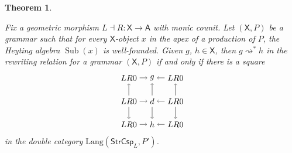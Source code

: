 \documentclass{amsart}
\newcommand{\A}{\cat{A}}
\newcommand{\X}{\cat{X}}
\newcommand{\StrCsp}{\cat{StrCsp}}
\newcommand{\Lang}{\mathrm{Lang}}
\newcommand{\cat}[1]{\mathsf{#1}}
\newcommand{\from}{\colon}
\newcommand{\deriv}[2]{#1 \rightsquigarrow^\ast #2}
\DeclareMathOperator{\Sub}{Sub}
\newtheorem{theorem}{Theorem}[section]
\theoremstyle{remark}
\theoremstyle{definition}
\begin{document}
\begin{theorem} \label{thm:inductive-rewriting}
  
  Fix a geometric morphism $ L \dashv R \from \X \to \A $ with monic
  counit. Let $ ( \X , P ) $ be a grammar such that for every
  $ \X $-object $ x $ in the apex of a production of $ P $, the
  Heyting algebra $ \Sub (x) $ is well-founded. Given $ g $,
  $ h \in \X $, then $ \deriv{g}{h} $ in the rewriting relation for a
  grammar $ ( \X , P ) $ if and only if there is a square
  \[
    \begin{tikzpicture}
      \node (1t) at (0,2) {$ LR 0 $};
      \node (2t) at (1,2) {$ g $};
      \node (3t) at (2,2) {$ LR 0 $};
      \node (1m) at (0,1) {$ LR 0 $};
      \node (2m) at (1,1) {$ d $};
      \node (3m) at (2,1) {$ LR 0 $};
      \node (1b) at (0,0) {$ LR 0 $};
      \node (2b) at (1,0) {$ h $};
      \node (3b) at (2,0) {$ LR 0 $};
      \draw [->] (1t) to node [] {\scriptsize{$  $}} (2t);
      \draw [->] (3t) to node [] {\scriptsize{$  $}} (2t);
      \draw [->] (1m) to node [] {\scriptsize{$  $}} (2m);
      \draw [->] (3m) to node [] {\scriptsize{$  $}} (2m);
      \draw [->] (1b) to node [] {\scriptsize{$  $}} (2b);
      \draw [->] (3b) to node [] {\scriptsize{$  $}} (2b);
      \draw [->] (1m) to node [] {\scriptsize{$  $}} (1t);
      \draw [->] (1m) to node [] {\scriptsize{$  $}} (1b);
      \draw [->] (2m) to node [] {\scriptsize{$  $}} (2t);
      \draw [->] (2m) to node [] {\scriptsize{$  $}} (2b);
      \draw [->] (3m) to node [] {\scriptsize{$  $}} (3t);
      \draw [->] (3m) to node [] {\scriptsize{$  $}} (3b);
    \end{tikzpicture}
  \]
  in the double category $ \Lang ( \StrCsp_L , P' ) $.
\end{theorem}
\end{document}
